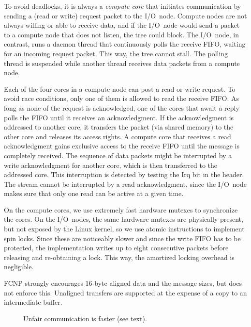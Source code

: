 \documentclass[journal]{IEEEtran}
\begin{document}
To avoid deadlocks, it is always a \emph{compute core\/} that initiates
communication by sending a (read or write) request packet to the I/O~node.
Compute nodes are not always willing or able to receive data, and
if the I/O~node would send a packet to a compute node that does not listen,
the tree could block.
The I/O~node, in contrast, runs a daemon thread that continuously polls the
receive FIFO, waiting for an incoming request packet.
This way, the tree cannot stall.
The polling thread is suspended while another thread receives data packets
from a compute node.

Each of the four cores in a compute node can post a read or write request.
To avoid race conditions, only one of them is allowed to read the receive FIFO.
As long as none of the request is acknowledged, one of the cores that await
a reply polls the FIFO until it receives an acknowledgment.
If the acknowledgment is addressed to another core, it transfers the packet
(via shared memory) to the other core and releases its access rights.
A compute core that receives a read acknowledgment gains exclusive access to
the receive FIFO until the message is completely received.
The sequence of data packets might be interrupted by a write acknowledgment
for another core, which is then transferred to the addressed core.
This interruption is detected by testing the Irq bit in the header.
The stream cannot be interrupted by a read acknowledgment, since the I/O~node
makes sure that only one read can be active at a given time.

On the compute cores, we use extremely fast hardware mutexes to synchronize
the cores.
On the I/O~nodes, the same hardware mutexes are physically present, but not
exposed by the Linux kernel, so we use atomic instructions to implement spin
locks.
Since these are noticeably slower and since the write FIFO has to be protected,
the implementation writes up to eight consecutive packets before releasing
and re-obtaining a lock.
This way, the amortized locking overhead is negligible.

FCNP strongly encourages 16-byte aligned data and the message sizes, but
does not enforce this.
Unaligned transfers are supported at the expense of a copy to an
intermediate buffer.

\begin{figure}[h]
\begin{center}
\begin{vbox}
\end{vbox}
\vspace{5mm}
\end{center}
\caption{Unfair communication is faster (see text).}
\label{fig:fair-unfair}
\end{figure}
\end{document}
